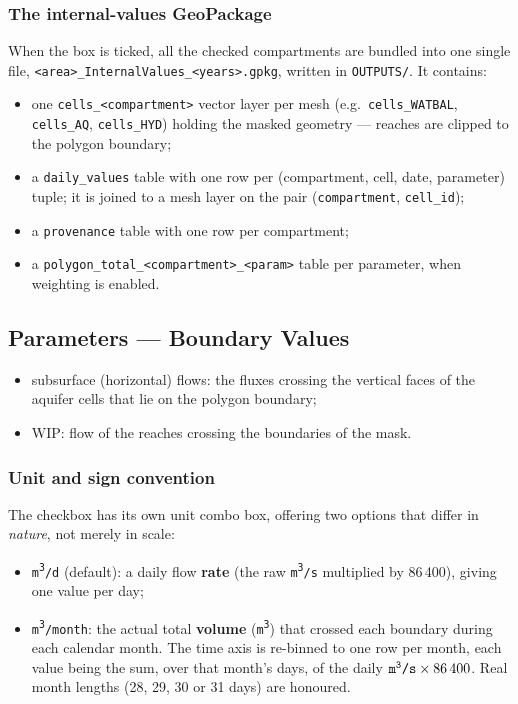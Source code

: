 \subsubsection*{The internal-values GeoPackage}
\label{sec-extract-internal-gpkg}
When the  box is ticked, all the checked compartments are bundled into one single file, \texttt{<area>\_InternalValues\_<years>.gpkg}, written in \texttt{OUTPUTS/}. It contains:
\begin{itemize}
    \item one \texttt{cells\_<compartment>} vector layer per mesh (e.g.\ \texttt{cells\_WATBAL}, \texttt{cells\_AQ}, \texttt{cells\_HYD}) holding the masked geometry ---  reaches are clipped to the polygon boundary;
    \item a \texttt{daily\_values} table with one row per (compartment, cell, date, parameter) tuple; it is joined to a mesh layer on the pair (\texttt{compartment}, \texttt{cell\_id});
    \item a \texttt{provenance} table with one row per compartment;
    \item a \texttt{polygon\_total\_<compartment>\_<param>} table per parameter, when weighting is enabled.
\end{itemize}

\subsection{Parameters --- Boundary Values}
\label{sec-extract-boundary}
\begin{itemize}
    \item {} subsurface (horizontal) flows: the fluxes crossing the vertical faces of the aquifer cells that lie on the polygon boundary;
    \item {} WIP: flow of the reaches crossing the boundaries of the mask.
\end{itemize}

\subsubsection*{Unit and sign convention}
The  checkbox has its own unit combo box, offering two options that differ in \emph{nature}, not merely in scale:
\begin{itemize}
    \item \texttt{m\textsuperscript{3}/d} (default): a daily flow \textbf{rate} (the raw \texttt{m\textsuperscript{3}/s} multiplied by 86\,400), giving one value per day;
    \item \texttt{m\textsuperscript{3}/month}: the actual total \textbf{volume} (\texttt{m\textsuperscript{3}}) that crossed each boundary during each calendar month. The time axis is re-binned to one row per month, each value being the sum, over that month's days, of the daily $\texttt{m\textsuperscript{3}/s} \times 86\,400$. Real month lengths (28, 29, 30 or 31 days) are honoured.
\end{itemize}

